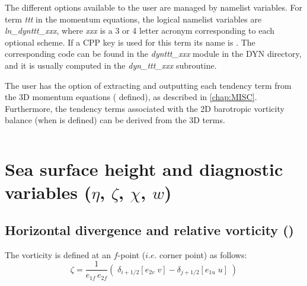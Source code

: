 \documentclass[../tex_main/NEMO_manual]{subfiles}
\begin{document}
The different options available to the user are managed by namelist variables. 
For term \textit{ttt} in the momentum equations, the logical namelist variables are \textit{ln\_dynttt\_xxx}, 
where \textit{xxx} is a 3 or 4 letter acronym corresponding to each optional scheme.
If a CPP key is used for this term its name is .
The corresponding code can be found in the \textit{dynttt\_xxx} module in the DYN directory,
and it is usually computed in the \textit{dyn\_ttt\_xxx} subroutine.

The user has the option of extracting and outputting each tendency term from the 3D momentum equations
( defined), as described in \autoref{chap:MISC}.
Furthermore, the tendency terms associated with the 2D barotropic vorticity balance (when  is defined)
can be derived from the 3D terms.

$\ $\newline    %

\section{Sea surface height and diagnostic variables ($\eta$, $\zeta$, $\chi$, $w$)}
\label{sec:DYN_divcur_wzv}

\subsection{Horizontal divergence and relative vorticity (\protect{})}
\label{subsec:DYN_divcur}

The vorticity is defined at an $f$-point ($i.e.$ corner point) as follows:
\begin{equation} \label{eq:divcur_cur}
\zeta =\frac{1}{e_{1f}\,e_{2f} }\left( {\;\delta _{i+1/2} \left[ {e_{2v}\;v} \right]
						        -\delta _{j+1/2} \left[ {e_{1u}\;u} \right]\;} \right)
\end{equation} 
\end{document}
